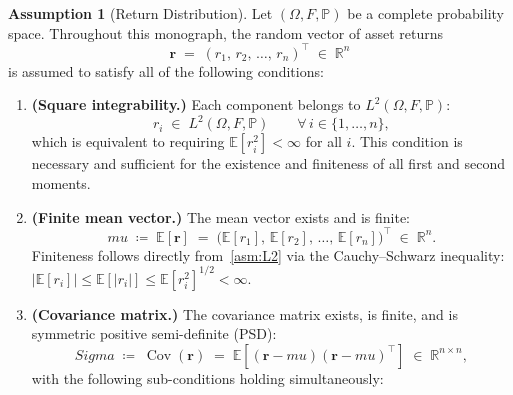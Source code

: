 \documentclass[12pt,openany]{book}
\newcommand{\R}{\mathbb{R}}
\newcommand{\E}{\mathbb{E}}
\newcommand{\Prob}{\mathbb{P}}
\newcommand{\bfmu}{\boldsymbol{\mu}}
\newcommand{\bfSigma}{\boldsymbol{\Sigma}}
\newcommand{\calF}{\mathcal{F}}
\DeclareMathOperator{\Cov}{Cov}
\numberwithin{equation}{chapter}
\theoremstyle{plain}
\theoremstyle{definition}
\newtheorem{assumption}[theorem]{Assumption}
\theoremstyle{remark}
\def\mathcal#1{#1}%
\def\calF{F}%
\def\bfmu{mu}%
\def\bfSigma{Sigma}%
\begin{document}
\begin{assumption}[Return Distribution]
\label{asm:returns}
Let $(\Omega, \calF, \Prob)$ be a complete probability space.
Throughout this monograph, the random vector of asset returns
\begin{equation}
  \mathbf{r}
  \;=\; (r_1,\, r_2,\, \ldots,\, r_n)^\top
  \;\in\; \R^n
\end{equation}
is assumed to satisfy all of the following conditions:
\begin{enumerate}[label=\textbf{(R\arabic*)}, leftmargin=*, widest=R3]

  \item \textbf{(Square integrability.)}
        Each component belongs to $L^2(\Omega, \calF, \Prob)$:
        \begin{equation}
          r_i \;\in\; L^2(\Omega, \calF, \Prob)
          \qquad \forall\, i \in \{1,\ldots,n\},
          \label{asm:L2}
        \end{equation}
        which is equivalent to requiring $\E[r_i^2] < \infty$
        for all $i$.
        This condition is necessary and sufficient for the
        existence and finiteness of all first and second moments.

  \item \textbf{(Finite mean vector.)}
        The mean vector exists and is finite:
        \begin{equation}
          \bfmu
          \;\coloneqq\;
          \E\!\left[\mathbf{r}\right]
          \;=\;
          \bigl(\E[r_1],\, \E[r_2],\, \ldots,\, \E[r_n]\bigr)^\top
          \;\in\; \R^n.
          \label{asm:mean}
        \end{equation}
        Finiteness follows directly from~\eqref{asm:L2}
        via the Cauchy--Schwarz inequality:
        $|\E[r_i]| \leq \E[|r_i|] \leq \E[r_i^2]^{1/2} < \infty$.

  \item \textbf{(Covariance matrix.)}
        The covariance matrix exists, is finite, and is
        symmetric positive semi-definite (PSD):
        \begin{equation}
          \bfSigma
          \;\coloneqq\;
          \Cov(\mathbf{r})
          \;=\;
          \E\!\left[
            (\mathbf{r} - \bfmu)(\mathbf{r} - \bfmu)^\top
          \right]
          \;\in\; \R^{n \times n},
          \label{asm:cov}
        \end{equation}
        with the following sub-conditions holding simultaneously:
        \begin{enumerate}[label=\textbf{(R3.\alph*)},
                          leftmargin=*, widest=R3.c]


\end{enumerate}
\end{enumerate}
\end{assumption}
\end{document}
